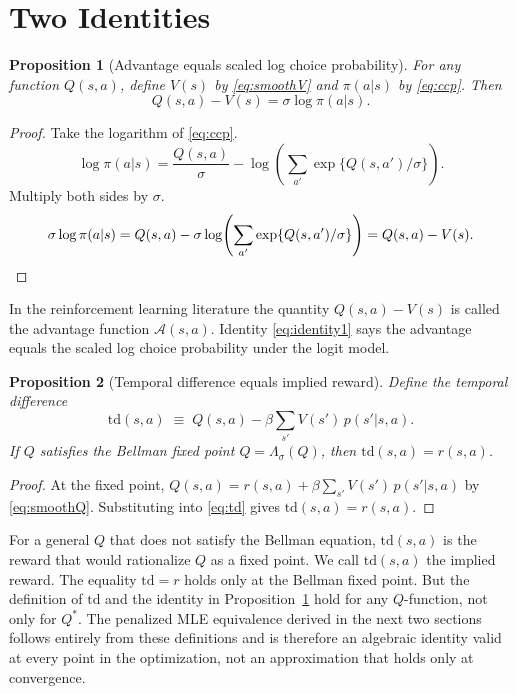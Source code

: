 \documentclass[11pt]{article}
\newtheorem{proposition}{Proposition}
\begin{document}
\section{Two Identities}

\begin{proposition}[Advantage equals scaled log choice probability]
\label{prop:identity1}
For any function $Q(s,a)$, define $V(s)$ by \eqref{eq:smoothV} and $\pi(a|s)$ by \eqref{eq:ccp}. Then
\begin{equation}
Q(s,a) - V(s) = \sigma \log \pi(a|s).
\label{eq:identity1}
\end{equation}
\end{proposition}

\begin{proof}
Take the logarithm of \eqref{eq:ccp}.
\[
\log \pi(a|s) = \frac{Q(s,a)}{\sigma} - \log\!\left(\sum_{a'} \exp\{Q(s,a')/\sigma\}\right).
\]
Multiply both sides by $\sigma$.
\[
\sigma \log \pi(a|s) = Q(s,a) - \sigma \log\!\left(\sum_{a'} \exp\{Q(s,a')/\sigma\}\right) = Q(s,a) - V(s). \qedhere
\]
\end{proof}

\noindent In the reinforcement learning literature the quantity $Q(s,a) - V(s)$ is called the advantage function $\mathcal{A}(s,a)$. Identity \eqref{eq:identity1} says the advantage equals the scaled log choice probability under the logit model.

\begin{proposition}[Temporal difference equals implied reward]
\label{prop:identity2}
Define the temporal difference
\begin{equation}
\mathrm{td}(s,a) \;\equiv\; Q(s,a) - \beta \sum_{s'} V(s')\, p(s'|s,a).
\label{eq:td}
\end{equation}
If $Q$ satisfies the Bellman fixed point $Q = \Lambda_\sigma(Q)$, then $\mathrm{td}(s,a) = r(s,a)$.
\end{proposition}

\begin{proof}
At the fixed point, $Q(s,a) = r(s,a) + \beta \sum_{s'} V(s')\, p(s'|s,a)$ by \eqref{eq:smoothQ}. Substituting into \eqref{eq:td} gives $\mathrm{td}(s,a) = r(s,a)$.
\end{proof}

\noindent For a general $Q$ that does not satisfy the Bellman equation, $\mathrm{td}(s,a)$ is the reward that would rationalize $Q$ as a fixed point. We call $\mathrm{td}(s,a)$ the implied reward. The equality $\mathrm{td} = r$ holds only at the Bellman fixed point. But the definition of $\mathrm{td}$ and the identity in Proposition~\ref{prop:identity1} hold for any $Q$-function, not only for $Q^*$. The penalized MLE equivalence derived in the next two sections follows entirely from these definitions and is therefore an algebraic identity valid at every point in the optimization, not an approximation that holds only at convergence.
\end{document}
